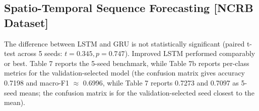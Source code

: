 \documentclass[runningheads]{llncs}
\begin{document}
\subsection{Spatio-Temporal Sequence Forecasting [NCRB Dataset]}
The difference between LSTM and GRU is not statistically significant (paired t-test across 5 seeds: $t = 0.345, p = 0.747$). Improved LSTM performed comparably or best. Table 7 reports the 5-seed benchmark, while Table 7b reports per-class metrics for the validation-selected model (the confusion matrix gives accuracy 0.7198 and macro-F1 $\approx$ 0.6996, while Table 7 reports 0.7273 and 0.7097 as 5-seed means; the confusion matrix is for the validation-selected seed closest to the mean).

\begin{table}[ht]
\caption{5-seed recurrent sequence forecasting performance on locked NCRB 2013--2014 test cohort.}
\centering
{}
\end{table}
\end{document}
